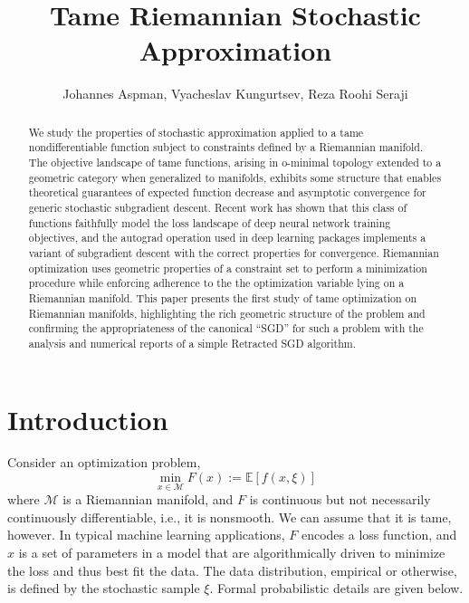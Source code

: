 \documentclass{article}
\begin{document}
\title{Tame Riemannian Stochastic Approximation}
\author{Johannes Aspman, Vyacheslav Kungurtsev, Reza Roohi Seraji}

\maketitle

\begin{abstract}
We study the properties of stochastic approximation applied to a tame nondifferentiable function subject to constraints defined by a Riemannian manifold. The objective landscape of tame functions, arising in o-minimal topology extended to a geometric category when generalized to manifolds, exhibits some structure that enables theoretical guarantees of expected function decrease and asymptotic convergence for generic stochastic subgradient descent. Recent work has shown that this class of functions faithfully model the loss landscape of deep neural network training objectives, and the autograd operation used in deep learning packages implements a variant of subgradient descent with the correct properties for convergence. Riemannian optimization uses geometric properties of a constraint set to perform a minimization procedure while enforcing adherence to the the optimization variable lying on a Riemannian manifold. This paper presents the first study of tame optimization on Riemannian manifolds, highlighting the rich geometric structure of the problem and confirming the appropriateness of the canonical ``SGD'' for such a problem with the analysis and numerical reports of a simple Retracted SGD algorithm.
\end{abstract}



\section{Introduction}
Consider an optimization problem,
\begin{equation}\label{eq:prob1}
\min\limits_{x\in\mathcal{M}} F(x):=\mathbb{E}[f(x,\xi)]
\end{equation}
where $\mathcal{M}$ is a Riemannian manifold, and $F$ is continuous but not necessarily continuously differentiable, i.e., it is nonsmooth. We can assume that it is tame, however. In typical machine learning applications, $F$ encodes a loss function, and $x$ is a set of parameters in a model that are algorithmically driven to minimize the loss and thus best fit the data. The data distribution, empirical or otherwise, is defined by the stochastic sample $\xi$. Formal probabilistic details are given below.
\end{document}
